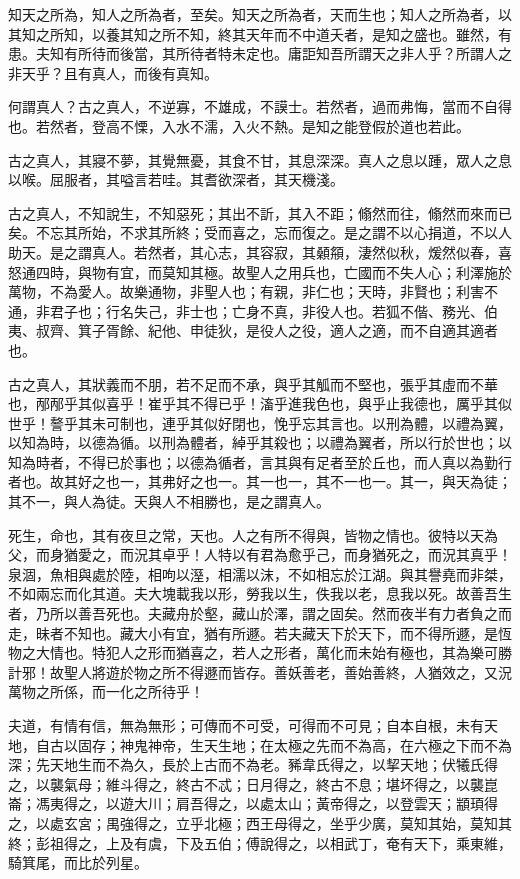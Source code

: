 
\begin{pinyinscope}
知天之所為，知人之所為者，至矣。知天之所為者，天而生也；知人之所為者，以其知之所知，以養其知之所不知，終其天年而不中道夭者，是知之盛也。雖然，有患。夫知有所待而後當，其所待者特未定也。庸詎知吾所謂天之非人乎？所謂人之非天乎？且有真人，而後有真知。

何謂真人？古之真人，不逆寡，不雄成，不謨士。若然者，過而弗悔，當而不自得也。若然者，登高不慄，入水不濡，入火不熱。是知之能登假於道也若此。

古之真人，其寢不夢，其覺無憂，其食不甘，其息深深。真人之息以踵，眾人之息以喉。屈服者，其嗌言若哇。其耆欲深者，其天機淺。

古之真人，不知說生，不知惡死；其出不訢，其入不距；翛然而往，翛然而來而已矣。不忘其所始，不求其所終；受而喜之，忘而復之。是之謂不以心捐道，不以人助天。是之謂真人。若然者，其心志，其容寂，其顙頯，淒然似秋，煖然似春，喜怒通四時，與物有宜，而莫知其極。故聖人之用兵也，亡國而不失人心；利澤施於萬物，不為愛人。故樂通物，非聖人也；有親，非仁也；天時，非賢也；利害不通，非君子也；行名失己，非士也；亡身不真，非役人也。若狐不偕、務光、伯夷、叔齊、箕子胥餘、紀他、申徒狄，是役人之役，適人之適，而不自適其適者也。

古之真人，其狀義而不朋，若不足而不承，與乎其觚而不堅也，張乎其虛而不華也，邴邴乎其似喜乎！崔乎其不得已乎！滀乎進我色也，與乎止我德也，厲乎其似世乎！謷乎其未可制也，連乎其似好閉也，悗乎忘其言也。以刑為體，以禮為翼，以知為時，以德為循。以刑為體者，綽乎其殺也；以禮為翼者，所以行於世也；以知為時者，不得已於事也；以德為循者，言其與有足者至於丘也，而人真以為勤行者也。故其好之也一，其弗好之也一。其一也一，其不一也一。其一，與天為徒；其不一，與人為徒。天與人不相勝也，是之謂真人。

死生，命也，其有夜旦之常，天也。人之有所不得與，皆物之情也。彼特以天為父，而身猶愛之，而況其卓乎！人特以有君為愈乎己，而身猶死之，而況其真乎！泉涸，魚相與處於陸，相呴以溼，相濡以沫，不如相忘於江湖。與其譽堯而非桀，不如兩忘而化其道。夫大塊載我以形，勞我以生，佚我以老，息我以死。故善吾生者，乃所以善吾死也。夫藏舟於壑，藏山於澤，謂之固矣。然而夜半有力者負之而走，昧者不知也。藏大小有宜，猶有所遯。若夫藏天下於天下，而不得所遯，是恆物之大情也。特犯人之形而猶喜之，若人之形者，萬化而未始有極也，其為樂可勝計邪！故聖人將遊於物之所不得遯而皆存。善妖善老，善始善終，人猶效之，又況萬物之所係，而一化之所待乎！

夫道，有情有信，無為無形；可傳而不可受，可得而不可見；自本自根，未有天地，自古以固存；神鬼神帝，生天生地；在太極之先而不為高，在六極之下而不為深；先天地生而不為久，長於上古而不為老。豨韋氏得之，以挈天地；伏犧氏得之，以襲氣母；維斗得之，終古不忒；日月得之，終古不息；堪坏得之，以襲崑崙；馮夷得之，以遊大川；肩吾得之，以處太山；黃帝得之，以登雲天；顓頊得之，以處玄宮；禺強得之，立乎北極；西王母得之，坐乎少廣，莫知其始，莫知其終；彭祖得之，上及有虞，下及五伯；傅說得之，以相武丁，奄有天下，乘東維，騎箕尾，而比於列星。


\end{pinyinscope}
